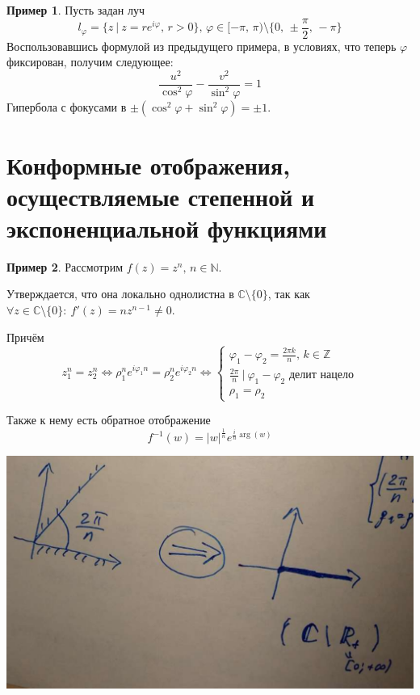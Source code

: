 \documentclass[a4paper,12pt]{article}
\renewcommand{\phi}{\ensuremath{\varphi}}
\theoremstyle{plain}
\theoremstyle{definition}
\newtheorem*{example}{Пример}
\theoremstyle{remark}
\begin{document}
\begin{example}
	Пусть задан луч
	\[
		l_\phi = \{z \:\vert\: z = re^{i\phi},\, r > 0\},\, \phi \in [-\pi,\, \pi) \setminus \{0,\, \pm\frac{\pi}{2},\, -\pi\}
	\]
	Воспользовавшись формулой из предыдущего примера, в условиях, что теперь $\phi$ фиксирован, получим следующее:
	\[
		\frac{u^2}{\cos^2\phi} - \frac{v^2}{\sin^2 \phi} = 1
	\]
	Гипербола с фокусами в $\pm(\cos^2\phi + \sin^2\phi) = \pm1$.
\end{example}

\section{Конформные отображения, осуществляемые степенной и экспоненциальной функциями}
\begin{example}
	Рассмотрим $f(z) = z^n,\, n \in \mathbb{N}$.

	Утверждается, что она локально однолистна в $\mathbb{C} \setminus \{0\}$, так как $\forall z \in \mathbb{C} \setminus \{0\} :\: f'(z) = nz^{n - 1} \neq 0$.

	Причём 
	\[
		z_1^n = z_2^n \Leftrightarrow \rho_1^ne^{i\phi_1n} = \rho_2^ne^{i\phi_2n} \Leftrightarrow 
		\begin{cases}
			\phi_1 - \phi_2 = \frac{2\pi k}{n},\, k \in \mathbb{Z}\\ 
			\frac{2\pi}{n} \:\vert\: \phi_1 - \phi_2 \text{  делит нацело}\\
			\rho_1 = \rho_2
		\end{cases}
	\]

	Также к нему есть обратное отображение
	\[
		f^{-1}(w) = \vert w\vert^{\frac{1}{n}}e^{\frac{i}{n}\arg(w)}
	\]

	\includegraphics[scale=0.3]{assets/power_ex.png}
\end{example}
\end{document}
